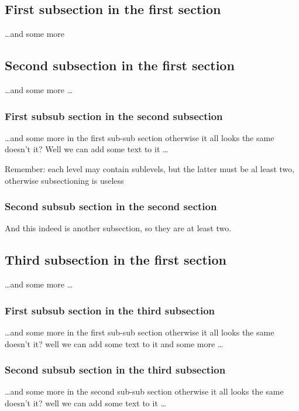 \subsection{First subsection in the first section}
\dots and some more 

\kant[4]

\subsection{Second subsection in the first section}
\dots and some more \dots

\kant[5]

\subsubsection{First subsub section in the second subsection}
\dots and some more in the first sub-sub section otherwise it
all looks the same doesn't it? Well we can add some text to it \dots


Remember: each level may contain sublevels, but the latter must be al least two, otherwise subsectioning is useless
\kant[6]

\subsubsection{Second subsub section in the second section}
And this indeed is another subsection, so they are at least two.

\subsection{Third subsection in the first section}
\dots and some more \dots

\subsubsection{First subsub section in the third subsection}
\dots and some more in the first sub-sub section otherwise it all looks the same doesn't it? well we can add some text to it and some more \dots

\kant[7]

\subsubsection{Second subsub section in the third subsection}
\dots and some more in the second sub-sub section otherwise it all looks the same doesn't it? well we can add some text to it \dots


